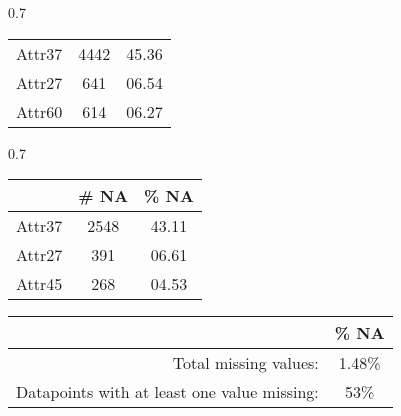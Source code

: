 \begin{table*}[htbp]
\begin{subtable}[t]{0.7\columnwidth}
\begin{tabular}{ccc}
        
        Attr37 & 4442 & 45.36 \\
        Attr27 & 641 & 06.54 \\
        Attr60 & 614 & 06.27 \\


        \hline
    \end{tabular}
    \caption{\label{tab::attr_missing_4} Year 4}
    
\end{subtable}
\hfill
\begin{subtable}[t]{0.7\columnwidth}
    \begin{tabular}{ccc}
        \hline
         ~ & \textbf{\# NA} & \textbf{\% NA} \\
         \hline
   
        Attr37 & 2548 & 43.11 \\
        Attr27 & 391 & 06.61 \\
        Attr45 & 268 & 04.53 \\

        \hline
    \end{tabular}
    \caption{\label{tab::attr_missing_5} Year 5}
    
\end{subtable}

\begin{subtable}[t]{\columnwidth}
    \begin{tabular}{rc}
        \hline
         ~ &  \textbf{\% NA} \\
         \hline
         Total missing values: & 1.48\% \\
         Datapoints with at least one value missing: & 53\% \\
        \hline
    \end{tabular}
    \caption{\label{tab::attr_missing_overall} Overall}
    
\end{subtable}

\caption{\label{tab::attr_missing} Distribution of missing values}

\end{table*}


